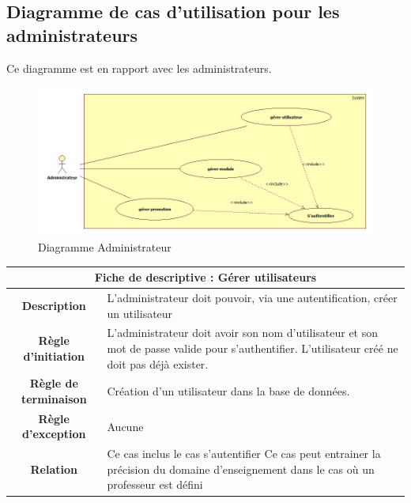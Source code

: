 \documentclass[10pt,a4paper,titlepage]{report}
\begin{document}
	
	\subsection{Diagramme de cas d'utilisation pour les administrateurs}
	Ce diagramme est en rapport avec les administrateurs.
	\begin{figure}[h!]
		\caption{Diagramme Administrateur}
		\centering
		\includegraphics[scale=0.4]{Include/admin.jpg}
\end{figure}

	\begin{tabular}{|c|p{8cm}|}
	\hline 
	\multicolumn{2}{|c|}{\textbf{Fiche de descriptive : Gérer utilisateurs}} \\ 
	\hline 
	\textbf{Description} & L'administrateur doit pouvoir, via une autentification, créer un utilisateur \\  
	\hline
	\textbf{Règle d'initiation} & L'administrateur doit avoir son nom d'utilisateur et son mot de passe valide pour s'authentifier.
				L'utilisateur créé ne doit pas déjà exister. \\ 
	\hline 
	\textbf{Règle de terminaison} & Création d'un utilisateur dans la base de données. \\ 
	\hline 
	\textbf{Règle d'exception} & Aucune \\ 
	\hline 
	\textbf{Relation} & Ce cas inclus le cas s'autentifier
				Ce cas peut entrainer la précision du domaine d'enseignement dans le cas où un professeur est défini
 \\ 
	\hline 
	\end{tabular}
	
\end{document}
